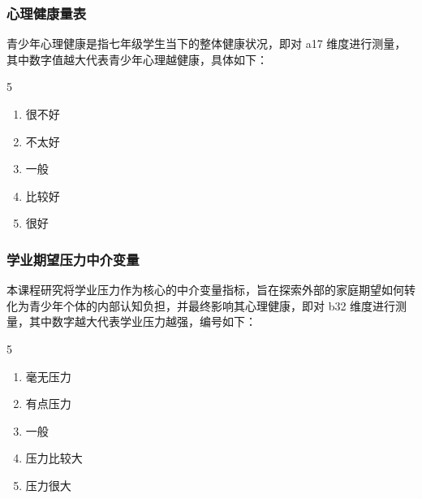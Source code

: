 \documentclass[zihao = -4, linespread = 1.5]{article}
\begin{document}
\subsubsection{心理健康量表}
青少年心理健康是指七年级学生当下的整体健康状况，即对 a17 维度进行测量，其中数字值越大代表青少年心理越健康，具体如下：

\begin{center}
    \begin{minipage}{1\textwidth}
        \setlength{\columnsep}{1em}
        \setlength{\columnseprule}{0.5pt}
        \begin{multicols}{5}
            \begin{enumerate}
                \item 很不好
                \item 不太好
                \item 一般
                \item 比较好
                \item 很好
            \end{enumerate}
        \end{multicols}
    \end{minipage}
\end{center}



\subsubsection{学业期望压力中介变量}
本课程研究将学业压力作为核心的中介变量指标，旨在探索外部的家庭期望如何转化为青少年个体的内部认知负担，并最终影响其心理健康，即对 b32 维度进行测量，其中数字越大代表学业压力越强，编号如下：

\begin{center}
    \begin{minipage}{1\textwidth}
        \setlength{\columnsep}{0em}
        \setlength{\columnseprule}{0.5pt}
        \begin{multicols}{5}
            \begin{enumerate}
                \item 毫无压力
                \item 有点压力
                \item 一般
                \item 压力比较大
                \item 压力很大
            \end{enumerate}
        \end{multicols}
    \end{minipage}
\end{center}
\end{document}
